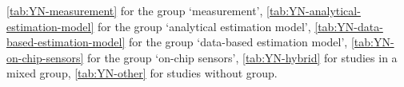 \ref{tab:YN-measurement} for the group `measurement', \ref{tab:YN-analytical-estimation-model} for the group `analytical estimation model', \ref{tab:YN-data-based-estimation-model} for the group `data-based estimation model', \ref{tab:YN-on-chip-sensors} for the group `on-chip sensors', \ref{tab:YN-hybrid} for studies in a mixed group, \ref{tab:YN-other} for studies without group.%